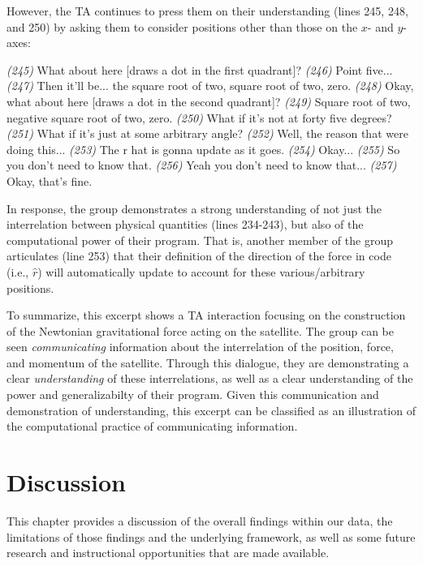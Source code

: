 \documentclass{msuphddissertation}
\begin{document}
\begin{doublespace}
However, the TA continues to press them on their understanding (lines 245, 248, and 250) by asking them to consider positions other than those on the $x$- and $y$-axes: \begin{description}
\TA \textit{(245)} What about here [draws a dot in the first quadrant]?
\SD \textit{(246)} Point five...
\SB \textit{(247)} Then it'll be... the square root of two, square root of two, zero.
\TA \textit{(248)} Okay, what about here [draws a dot in the second quadrant]?
\SB \textit{(249)} Square root of two, negative square root of two, zero.
\TA \textit{(250)} What if it's not at forty five degrees?
\TA \textit{(251)} What if it's just at some arbitrary angle?
\SB \textit{(252)} Well, the reason that were doing this...			
\SD \textit{(253)} The r hat is gonna update as it goes.
\TA \textit{(254)} Okay...
\SD \textit{(255)} So you don’t need to know that.
\SB \textit{(256)} Yeah you don’t need {to know that}...		
\TA \textit{(257)} Okay, that’s fine.
\end{description}  In response, the group demonstrates a strong understanding of not just the interrelation between physical quantities (lines 234-243), but also of the computational power of their program.  That is, another member of the group articulates (line 253) that their definition of the direction of the force in code (i.e., $\hat{r}$) will automatically update to account for these various/arbitrary positions.

To summarize, this excerpt shows a TA interaction focusing on the construction of the Newtonian gravitational force acting on the satellite.  The group can be seen \textit{communicating} information about the interrelation of the position, force, and momentum of the satellite.  Through this dialogue, they are demonstrating a clear \textit{understanding} of these interrelations, as well as a clear understanding of the power and generalizabilty of their program.  Given this communication and demonstration of understanding, this excerpt can be classified as an illustration of the computational practice of communicating information.

%
%
%
%
%
%
%
%
%
%
%
%
%
%
%
%

\chapter{Discussion}\label{CH6:Discussion}

This chapter provides a discussion of the overall findings within our data, the limitations of those findings and the underlying framework, as well as some future research and instructional opportunities that are made available.


\end{doublespace}
\end{document}
